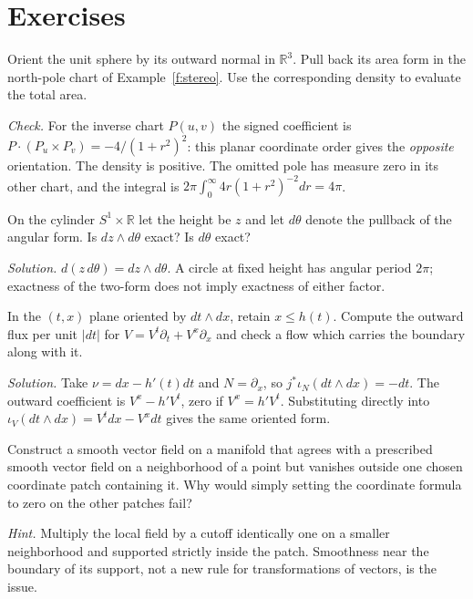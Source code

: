 \section*{Exercises}
\begin{exercise}Orient the unit sphere by its outward normal in $\mathbb R^3$. Pull back its area form in the north-pole chart of Example~\ref{f:stereo}. Use the corresponding density to evaluate the total area.\end{exercise}
\noindent\emph{Check.} For the inverse chart $P(u,v)$ the signed coefficient is $P\cdot(P_u\mathbin{\times}P_v)=-4/(1+r^2)^2$: this planar coordinate order gives the \emph{opposite} orientation. The density is positive. The omitted pole has measure zero in its other chart, and the integral is $2\pi\int_0^\infty4r(1+r^2)^{-2}dr=4\pi$.
\begin{exercise}On the cylinder $S^1\times\mathbb R$ let the height be $z$ and let $d\theta$ denote the pullback of the angular form. Is $dz\wedge d\theta$ exact? Is $d\theta$ exact?\end{exercise}
\noindent\emph{Solution.} $d(z\,d\theta)=dz\wedge d\theta$. A circle at fixed height has angular period $2\pi$; exactness of the two-form does not imply exactness of either factor.
\begin{exercise}In the $(t,x)$ plane oriented by $dt\wedge dx$, retain $x\le h(t)$. Compute the outward flux per unit $|dt|$ for $V=V^t\partial_t+V^x\partial_x$ and check a flow which carries the boundary along with it.\end{exercise}
\noindent\emph{Solution.} Take $\nu=dx-h'(t)dt$ and $N=\partial_x$, so $j^*\iota_N(dt\wedge dx)=-dt$. The outward coefficient is $V^x-h'V^t$, zero if $V^x=h'V^t$. Substituting directly into $\iota_V(dt\wedge dx)=V^t dx-V^x dt$ gives the same oriented form.
\begin{exercise}Construct a smooth vector field on a manifold that agrees with a prescribed smooth vector field on a neighborhood of a point but vanishes outside one chosen coordinate patch containing it. Why would simply setting the coordinate formula to zero on the other patches fail?\end{exercise}
\noindent\emph{Hint.} Multiply the local field by a cutoff identically one on a smaller neighborhood and supported strictly inside the patch. Smoothness near the boundary of its support, not a new rule for transformations of vectors, is the issue.
